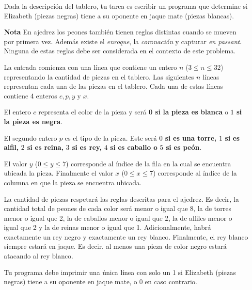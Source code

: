 \documentclass{oci}
\begin{document}
\begin{problemDescription}
\begin{center}
\scalebox{1}{\chessboard[setfen=7K/6q1/6k1/8/8/8/8/8]}
\end{center}

Dada la descripción del tablero, tu tarea es escribir un programa que determine si Elizabeth
(piezas negras) tiene a su oponente en jaque mate (piezas blancas).

{\bf Nota}\hspace{0.5em} En ajedrez los peones también tienen reglas distintas cuando se mueven
por primera vez.
Además existe el \emph{enroque}, la \emph{coronación} y
capturar \emph{en passant}.
Ninguna de estas reglas debe ser considerada en el contexto de este problema.

\end{problemDescription}

\begin{inputDescription}
La entrada comienza con una línea que contiene un entero $n$ ($ 3 \leq n
    \leq 32$) representando la cantidad de piezas en el tablero.
Las siguientes $n$ líneas representan cada una de las piezas en el tablero.
Cada una de estas líneas contiene 4 enteros $c, p, y$ y $x$.

El entero $c$ representa el color de la pieza y será {\bf 0 si la pieza es blanca} o
{\bf $1$ si la pieza es negra}.

El segundo entero $p$ es el tipo de la pieza.
Este será {\bf $0$ si es una torre, $1$ si es alfil, $2$ si es reina, $3$ si es rey, $4$
si es caballo o $5$ si es peón}.

El valor $y$ ($0\leq y \leq 7$) corresponde al índice de la fila en la cual se encuentra
ubicada la pieza.
Finalmente el valor $x$ ($0\leq x \leq 7$) corresponde al índice de la columna en que
la pieza se encuentra ubicada.

La cantidad de piezas respetará las reglas descritas para el ajedrez.
Es decir, la cantidad total de peones de cada color será menor o igual que 8, la de torres
menor o igual que 2, la de caballos menor o igual que 2, la de alfiles menor o igual que 2 y la
de reinas menor o igual que 1.
Adicionalmente, habrá exactamente un rey negro y exactamente un rey blanco.
Finalmente, el rey blanco siempre estará en jaque.
Es decir, al menos una pieza de color negro estará atacando al rey blanco.
\end{inputDescription}

\begin{outputDescription}
Tu programa debe imprimir una única línea con solo un 1 si
Elizabeth (piezas negras) tiene a su oponente en jaque mate, o 0 en caso contrario.
\end{outputDescription}
\end{document}
